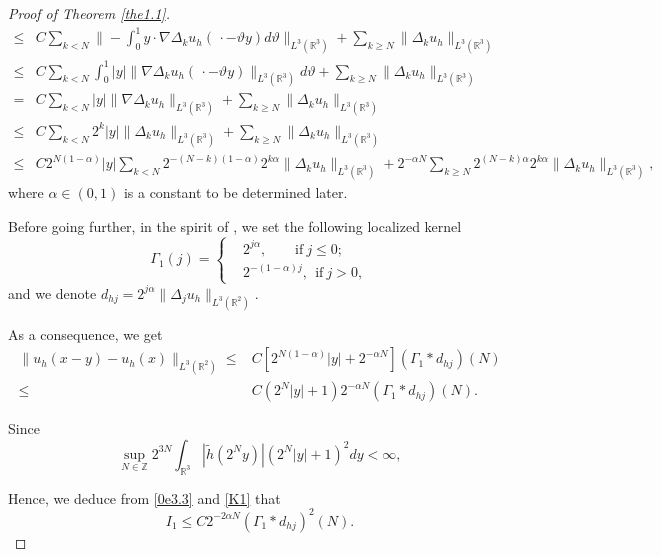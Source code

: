 \documentclass[11pt]{article}
\theoremstyle{plain}\newtheorem{definition}{Definition}[section]
\theoremstyle{definition}\newtheorem{theorem}{Theorem}[section]
\theoremstyle{plain}\newtheorem{lemma}[theorem]{Lemma}
\theoremstyle{plain}\newtheorem{coro}[theorem]{Corollary}
\theoremstyle{plain}\newtheorem{prop}[theorem]{Proposition}
\theoremstyle{remark}\newtheorem{remark}{Remark}[section]
\newcommand{\B}{\Big}
\newcommand{\be}{\begin{equation}}
\newcommand{\ee}{\end{equation}}
\newcommand{\ba}{\begin{aligned}}
\newcommand{\ea}{\end{aligned}}
\numberwithin{equation}{section}
\begin{document}
\begin{proof}[Proof of Theorem \ref{the1.1}]
\begin{align}
\leq&C\sum_{k< N}\B\| -\int_{0}^{1}y\cdot\nabla{\Delta}_{k}u_{h}(\,\cdot-\vartheta y)d\vartheta \B\|_{L^{3} (\mathbb{R}^{3})}+\sum_{k\geq N}\| {\Delta}_{k}u_{h}\|_{L^{3} (\mathbb{R}^{3})}\nonumber\\
\leq&C\sum_{k< N} \int_{0}^{1}|y|\B\|\nabla{\Delta}_{k}u_{h}(\,\cdot-\vartheta y)\B\|_{L^{3} (\mathbb{R}^{3})}d\vartheta +\sum_{k\geq N}\| {\Delta}_{k}u_{h}\|_{L^{3} (\mathbb{R}^{3})}\nonumber\\
=&C \sum_{k< N} |y| \B\|\nabla{\Delta}_{k}u_{h}\B\|_{L^{3} (\mathbb{R}^{3})} +\sum_{k\geq N}\| {\Delta}_{k}u_{h}\| _{L^{3} (\mathbb{R}^{3})} \nonumber\\
 \leq&C \sum_{k< N}2^{ k}|y| \| {\Delta}_{k}u_{h}\| _{L^{3} (\mathbb{R}^{3})}+\sum_{k\geq N}\| {\Delta}_{k}u_{h}\| _{L^{3} (\mathbb{R}^{3})} \nonumber\\
\leq&C  2^{ N(1-\alpha)}|y| \sum_{k< N}2^{- (N-k)(1-\alpha)}2^{ k\alpha}\| {\Delta}_{k}u_{h}\|_{L^{3} (\mathbb{R}^{3})} +2^{- \alpha N}\sum_{k\geq N} 2^{ (N-k)\alpha} 2^{ k\alpha}\| {\Delta}_{k}u_{h}\| _{L^{3} (\mathbb{R}^{3})},\label{0e3.3}
\end{align}
where $\alpha\in(0,1)$ is a constant to be determined later.



Before going further, in the spirit of  \cite{[CCFS]}, we set the following localized kernel
\be\label{K1}\Gamma_{1}(j)=\left\{\begin{aligned}
	&2^{j \alpha },~~~~~~~~~\text{if}~j\leq0;\\
	& 2^{-(1-\alpha)j},~~\text{if}~j>0,
\end{aligned}\right.
\ee
and  we denote $ {d}_{hj}=2^{j\alpha}\| {\Delta}_{j}u_{h}\|_{L^{3} (\mathbb{R}^{2})}$.

As a consequence, we get
$$\ba
\| u_{h}(x-y)-u_{h}(x) \|_{ L^{3} (\mathbb{R}^{2}) }\leq& C\left[ 2^{N(1-\alpha)}|y| +2^{  -\alpha  N}\right]\left(\Gamma_{1}\ast {d}_{hj}\right)(N)\\
\leq & C( 2^{N}|y| +1)2^{ -\alpha N}\left(\Gamma_{1}\ast  {d}_{hj}\right)(N).
 \ea$$

Since
$$ \sup_{N\in\mathbb{Z}} 2^{ 3N}\int_{\mathbb{R}^3}  |\tilde{h}(2^{N}y)|(2^{N}|y| +1)^{2}dy<\infty,$$

Hence, we deduce from  \eqref{0e3.3} and  \eqref{K1} that
$$I_{1}\leq C 2^{ -2\alpha N}\left(\Gamma_{1}\ast {d}_{hj}\right)^{2}(N).$$




\end{proof}
\end{document}
